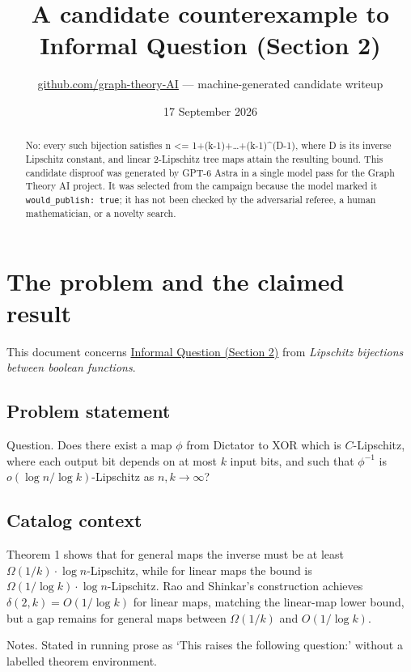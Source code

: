 \documentclass[
  11pt,
  a4paper,
]{article}
\title{A candidate counterexample to Informal Question (Section 2)}
\author{\href{https://github.com/graph-theory-AI}{github.com/graph-theory-AI}
--- machine-generated candidate writeup}
\date{17 September 2026}
\begin{document}
\maketitle
\begin{abstract}
No: every such bijection satisfies n \textless=
1+(k-1)+\ldots+(k-1)\^{}(D-1), where D is its inverse Lipschitz
constant, and linear 2-Lipschitz tree maps attain the resulting bound.
This candidate disproof was generated by GPT-6 Astra in a single model
pass for the Graph Theory AI project. It was selected from the campaign
because the model marked it \texttt{would\_publish:\ true}; it has not
been checked by the adversarial referee, a human mathematician, or a
novelty search.
\end{abstract}

\section{The problem and the claimed
result}\label{the-problem-and-the-claimed-result}

This document concerns
\href{https://graph-theory-ai.github.io/graph-conjectures/arxiv/1812.09215__00/}{Informal
Question (Section 2)} from \emph{Lipschitz bijections between boolean
functions}.

\subsection{Problem statement}\label{problem-statement}

Question. Does there exist a map \(\phi\) from Dictator to XOR which is
\(C\)-Lipschitz, where each output bit depends on at most \(k\) input
bits, and such that \(\phi^{-1}\) is \(o(\log n / \log k)\)-Lipschitz as
\(n, k \to \infty\)?

\subsection{Catalog context}\label{catalog-context}

Theorem 1 shows that for general maps the inverse must be at least
\(\Omega(1/k)\cdot\log n\)-Lipschitz, while for linear maps the bound is
\(\Omega(1/\log k)\cdot\log n\)-Lipschitz. Rao and Shinkar's
construction achieves \(\delta(2,k)=O(1/\log k)\) for linear maps,
matching the linear-map lower bound, but a gap remains for general maps
between \(\Omega(1/k)\) and \(O(1/\log k)\).

Notes. Stated in running prose as `This raises the following question:'
without a labelled theorem environment.
\end{document}

